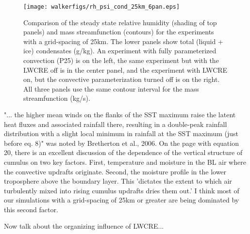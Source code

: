 \documentclass[11pt]{article}   	%
\begin{document}
\begin{figure}
  \centering
      \texttt{[image: walkerfigs/rh\_psi\_cond\_25km\_6pan.eps]}
      \caption{Comparison of the steady state relative humidity (shading of top panels) and mass 
      streamfunction (contours) for the experiments
      with a grid-spacing of 25km.  The lower panels show total (liquid + ice) condensates (g/kg).  
      An experiment with fully parameterized convection (P25) is on the left, the same 
      experiment but with the LWCRE off is in the center panel, and the experiment with LWCRE on, but the convective
      parameterization turned off is on the right.  All three panels use the same contour interval for the mass 
      streamfunction (kg/s).}
  \label{fig:rh_psi_P25vsE25}
\end{figure}

"... the higher mean winds on the flanks of the SST maximum raise the latent heat fluxes and associated rainfall there, resulting in a 
double-peak rainfall distribution with a slight local minimum in rainfall at the SST maximum (just before eq. 8)" 
was noted by Bretherton et al., 2006.  On the page with equation 20, there is an excellent discussion of the dependence of the 
vertical structure of cumulus on two key factors.  First, temperature and moisture in the BL air where the convective updrafts originate.
Second, the moisture profile in the lower troposphere above the boundary layer.  This 'dictates the extent to which air
turbulently mixed into rising cumulus updrafts dries them out.'  I think most of our simulations with a grid-spacing of 25km or 
greater are being dominated by this second factor.    

Now talk about the organizing influence of LWCRE...



\end{document}
